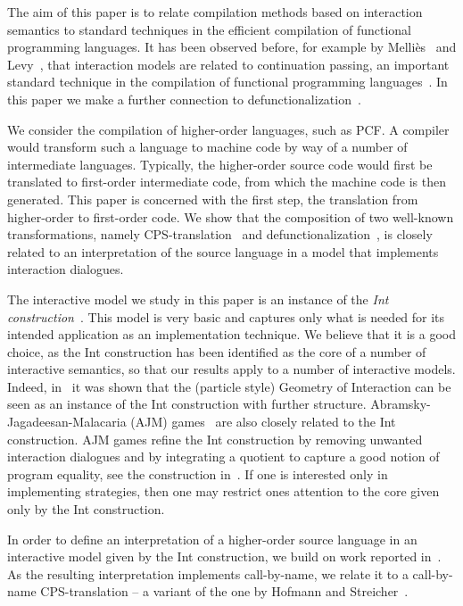\documentclass{LMCS}
\theoremstyle{definition}
\theoremstyle{plain}
\begin{document}
The aim of this paper is to relate compilation methods based on 
interaction semantics to standard techniques in the
efficient compilation of functional programming languages.
It has been observed before, for example by Melli\`es~\cite{mellies12} and
Levy~\cite{cbpv}, that interaction models are related to
continuation passing, an important standard technique in the compilation
of functional programming languages~\cite{DBLP:books/cu/Appel1992}.
In this paper we make a further connection to
defunctionalization~\cite{reynolds}.

We consider the compilation of higher-order languages, such as PCF. 
A compiler would transform such a 
language to machine code by way of a number of intermediate languages. 
Typically, the higher-order source code would first be translated to 
first-order intermediate code,
from which the machine code is then generated. 
This paper is concerned with the first step,
the translation from higher-order to first-order code.
We show that the composition of two well-known transformations,
namely CPS-translation~\cite{plotkin} and defunctionalization~\cite{reynolds}, 
is closely related to an interpretation 
of the source language in a model that implements interaction dialogues.

The interactive model we study in this paper is an instance of 
the \emph{Int construction}~\cite{Joyal96}.
This model is very basic and captures only what is needed for its
 intended application as an implementation technique. 
We believe that it is a good choice, as the Int construction has been 
identified as the core of a number of interactive semantics, 
so that our results apply to a number of interactive models.
Indeed, in~\cite{DBLP:journals/mscs/AbramskyHS02} it was shown that 
the (particle style) Geometry of
Interaction can be seen as an instance of the Int construction with further
structure.  Abramsky-Jagadeesan-Malacaria (AJM) games~\cite{AbramskyJM00}
are also closely related to the Int construction.
AJM games refine the Int construction by removing 
unwanted interaction dialogues and by integrating a quotient to capture a good
notion of program equality, see the construction in~\cite{AbramskyJM00}.  
If one is interested only in implementing
strategies, then one may restrict ones attention to the core given only by the
Int construction.

In order to define an interpretation of a higher-order source language in an
interactive model given by the Int construction, we build on work reported in~\cite{intml}.
As the resulting interpretation implements call-by-name, we
relate it to a call-by-name CPS-translation -- a variant of the
one by Hofmann and Streicher~\cite{DBLP:conf/lics/HofmannS97}.
\end{document}
